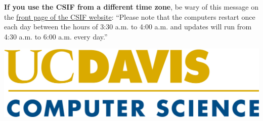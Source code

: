 \documentclass{article}
\begin{document}
\textbf{If you use the CSIF from a different time zone}, be wary of this message on the \href{http://csifdocs.cs.ucdavis.edu/home}{front page of the CSIF website}: ``Please note that the computers restart once each day between the hours of 3:30 a.m. to 4:00 a.m. and updates will run from 4:30 a.m. to 6:00 a.m. every day.''

\begin{center}
\includegraphics[scale=0.4]{UCD_CS_Logo}
\end{center}
\end{document}
